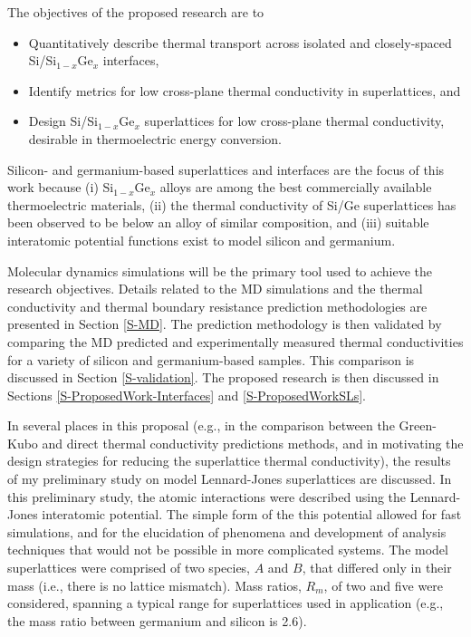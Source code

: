 \documentclass[letterpaper,12pt]{article}
\begin{document}
The objectives of the proposed research are to

\begin{itemize}
\item Quantitatively describe thermal transport across isolated and
closely-spaced Si/Si$_{1-x}$Ge$_x$ interfaces,

\item Identify metrics for low cross-plane thermal conductivity in
superlattices, and

\item Design Si/Si$_{1-x}$Ge$_x$ superlattices for low cross-plane
thermal conductivity, desirable in thermoelectric energy conversion.

\end{itemize}

Silicon- and germanium-based superlattices and interfaces are the
focus of this work because (i) Si$_{1-x}$Ge$_x$ alloys are among the
best commercially available thermoelectric
materials,\cite{bottner2006,chen2003} (ii) the thermal conductivity
of Si/Ge superlattices has been observed to be below an alloy of
similar composition,\cite{lee1997,chakraborty2003,borca-tasciuc2000}
and (iii) suitable interatomic potential functions exist to model
silicon and germanium.

Molecular dynamics simulations will be the primary tool used to
achieve the research objectives. Details related to the MD
simulations and the thermal conductivity and thermal boundary
resistance prediction methodologies are presented in Section
\ref{S-MD}. The prediction methodology is then validated by
comparing the MD predicted and experimentally measured thermal
conductivities for a variety of silicon and germanium-based samples.
This comparison is discussed in Section \ref{S-validation}. The
proposed research is then discussed in Sections
\ref{S-ProposedWork-Interfaces} and \ref{S-ProposedWorkSLs}.

In several places in this proposal (e.g., in the comparison between
the Green-Kubo and direct thermal conductivity predictions methods,
and in motivating the design strategies for reducing the
superlattice thermal conductivity), the results of my preliminary
study\cite{landry2008a} on model Lennard-Jones superlattices are
discussed. In this preliminary study, the atomic interactions were
described using the Lennard-Jones interatomic potential. The simple
form of the this potential allowed for fast simulations, and for the
elucidation of phenomena and development of analysis techniques that
would not be possible in more complicated systems. The model
superlattices were comprised of two species, $A$ and $B$, that
differed only in their mass (i.e., there is no lattice mismatch).
Mass ratios, $R_m$, of two and five were considered, spanning a
typical range for superlattices used in application (e.g., the mass
ratio between germanium and silicon is 2.6).
\end{document}
